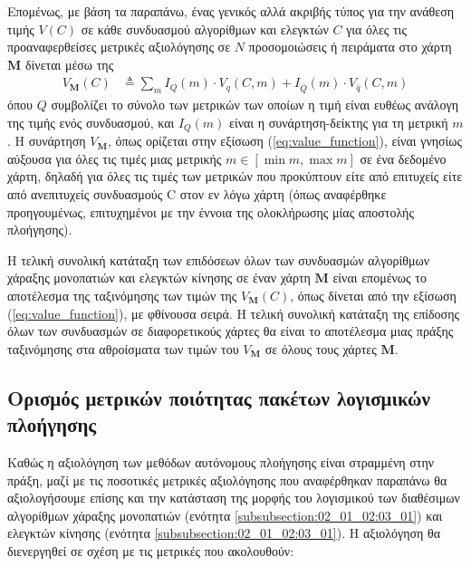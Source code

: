 Επομένως, με βάση τα παραπάνω, ένας γενικός αλλά ακριβής τύπος για την ανάθεση
τιμής $V(C)$ σε κάθε συνδυασμού αλγορίθμων και ελεγκτών $C$ για όλες τις
προαναφερθείσες μετρικές αξιολόγησης σε $N$ προσομοιώσεις ή πειράματα στο χάρτη
$\bm{M}$ δίνεται μέσω της
\begin{align}
  \label{eq:value_function}
  V_{\bm{M}}(C) &\triangleq \sum\limits_{m} I_Q(m) \cdot V_q(C,m) + I_{\overline{Q}}(m) \cdot V_{\overline{q}}(C,m)
\end{align}
όπου $Q$ συμβολίζει το σύνολο των μετρικών των οποίων η τιμή είναι ευθέως
ανάλογη της τιμής ενός συνδυασμού, και $I_Q(m)$ είναι η συνάρτηση-δείκτης για
τη μετρική $m$.  H συνάρτηση $V_{\bm{M}}$, όπως ορίζεται στην εξίσωση
(\ref{eq:value_function}), είναι γνησίως αύξουσα για όλες τις τιμές μιας
μετρικής $m \in [\min m, \max m]$ σε ένα δεδομένο χάρτη, δηλαδή για όλες τις
τιμές των μετρικών που προκύπτουν είτε από επιτυχείς είτε από ανεπιτυχείς
συνδυασμούς C στον εν λόγω χάρτη (όπως αναφέρθηκε προηγουμένως, επιτυχημένοι με
την έννοια της ολοκλήρωσης μίας αποστολής πλοήγησης).

Η τελική συνολική κατάταξη των επιδόσεων όλων των συνδυασμών αλγορίθμων χάραξης
μονοπατιών και ελεγκτών κίνησης σε έναν χάρτη $\bm{M}$ είναι επομένως το
αποτέλεσμα της ταξινόμησης των τιμών της $V_{\bm{M}}(C)$, όπως δίνεται από την
εξίσωση (\ref{eq:value_function}), με φθίνουσα σειρά. Η τελική συνολική
κατάταξη της επίδοσης όλων των συνδυασμών σε διαφορετικούς χάρτες θα είναι το
αποτέλεσμα μιας πράξης ταξινόμησης στα αθροίσματα των τιμών του $V_{\bm{M}}$ σε
όλους τους χάρτες $\bm{M}$.


\subsection{Ορισμός μετρικών ποιότητας πακέτων λογισμικών πλοήγησης}
\label{subsection:02_01_03:04}

Καθώς η αξιολόγηση των μεθόδων αυτόνομους πλοήγησης είναι στραμμένη στην πράξη,
μαζί με τις ποσοτικές μετρικές αξιολόγησης που αναφέρθηκαν παραπάνω θα
αξιολογήσουμε επίσης και την κατάσταση της μορφής του λογισμικού των διαθέσιμων
αλγορίθμων χάραξης μονοπατιών (ενότητα \ref{subsubsection:02_01_02:03_01})
και ελεγκτών κίνησης (ενότητα \ref{subsubsection:02_01_02:03_01}). Η αξιολόγηση
θα διενεργηθεί σε σχέση με τις μετρικές που ακολουθούν:

